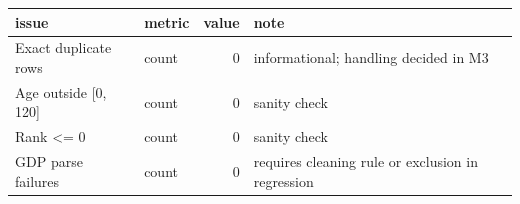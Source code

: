 \begin{tabular}{llrl}
\toprule
issue & metric & value & note \\
\midrule
Exact duplicate rows & count & 0 & informational; handling decided in M3 \\
Age outside [0, 120] & count & 0 & sanity check \\
Rank <= 0 & count & 0 & sanity check \\
GDP parse failures & count & 0 & requires cleaning rule or exclusion in regression \\
\bottomrule
\end{tabular}
